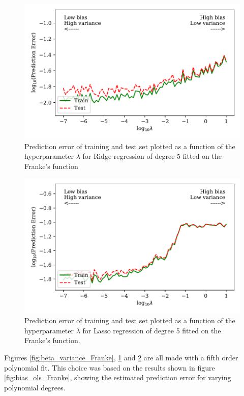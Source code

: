 \documentclass[a4paper, 10pt]{article}
\begin{document}
\begin{figure}[H]
    \includegraphics{figs/biasvariancetradeoff_Ridge_Franke.pdf}
    \caption{Prediction error of training and test set plotted as a function of the hyperparameter $\lambda$ for Ridge regression of degree 5 fitted on the Franke's function}
    \label{fig:bias_ridge_Franke}
\end{figure}

\begin{figure}[H]
    \includegraphics{figs/biasvariancetradeoff_LASSO_Franke.pdf}
    \caption{Prediction error of training and test set plotted as a function of the hyperparameter $\lambda$ for Lasso regression of degree 5 fitted on the Franke's function.}
    \label{fig:bias_lasso_Franke}
\end{figure}
Figures \ref{fig:beta_variance_Franke}, \ref{fig:bias_ridge_Franke} and \ref{fig:bias_lasso_Franke} are all made with a fifth order polynomial fit. This choice was based on the results shown in figure \ref{fig:bias_ols_Franke}, showing the estimated prediction error for varying polynomial degrees.
\end{document}
